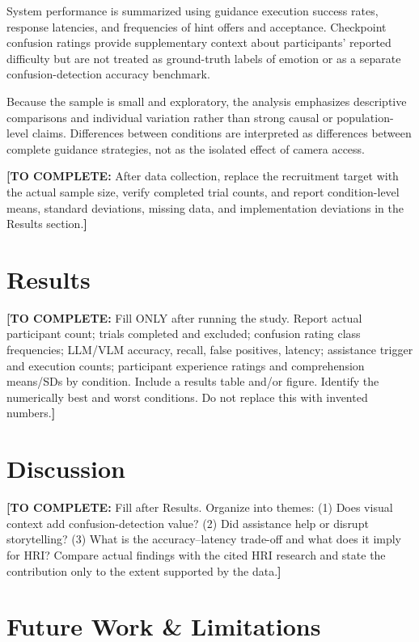 \documentclass[conference]{IEEEtran}
\newcommand{\drafttodo}[1]{\par\smallskip\noindent\textcolor{red!65!black}{\textbf{[TO COMPLETE:} #1\textbf{]}}\par\smallskip}
\begin{document}
System performance is summarized using guidance execution success rates, response latencies, and frequencies of hint offers and acceptance. Checkpoint confusion ratings provide supplementary context about participants' reported difficulty but are not treated as ground-truth labels of emotion or as a separate confusion-detection accuracy benchmark.

Because the sample is small and exploratory, the analysis emphasizes descriptive comparisons and individual variation rather than strong causal or population-level claims. Differences between conditions are interpreted as differences between complete guidance strategies, not as the isolated effect of camera access.

\drafttodo{After data collection, replace the recruitment target with the actual sample size, verify completed trial counts, and report condition-level means, standard deviations, missing data, and implementation deviations in the Results section.}



\section{Results}
\drafttodo{Fill ONLY after running the study. Report actual participant count; trials completed and excluded; confusion rating class frequencies; LLM/VLM accuracy, recall, false positives, latency; assistance trigger and execution counts; participant experience ratings and comprehension means/SDs by condition. Include a results table and/or figure. Identify the numerically best and worst conditions. Do not replace this with invented numbers.}

\section{Discussion}
\drafttodo{Fill after Results. Organize into themes: (1) Does visual context add confusion-detection value? (2) Did assistance help or disrupt storytelling? (3) What is the accuracy--latency trade-off and what does it imply for HRI? Compare actual findings with the cited HRI research and state the contribution only to the extent supported by the data.}

\section{Future Work \& Limitations}
\end{document}
